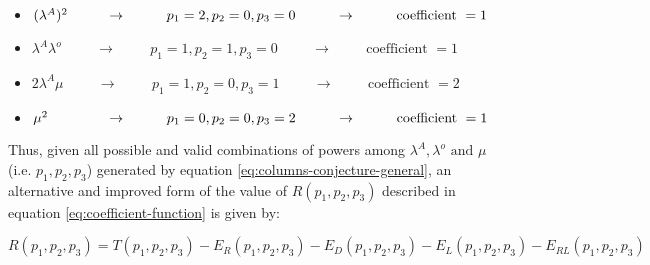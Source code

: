 \begin{itemize}
    \item \((\lambda^A)^2 \hspace{0.95cm} \rightarrow \hspace{1cm} 
    p_1 = 2, p_2=0, p_3=0 \hspace{1cm} \rightarrow \hspace{1cm} 
    \text{coefficient } = 1\)
    \item \(\lambda^A \lambda^o \hspace{1cm} \rightarrow \hspace{1cm} 
    p_1 = 1, p_2=1, p_3=0 \hspace{1cm} \rightarrow \hspace{1cm} 
    \text{coefficient } = 1\)
    \item \(2 \lambda^A \mu \hspace{1cm} \rightarrow \hspace{1cm}
     p_1 = 1, p_2=0, p_3=1 \hspace{1cm} \rightarrow \hspace{1cm} 
     \text{coefficient } = 2\)
    \item \(\mu^2 \hspace{1.45cm} \rightarrow \hspace{1cm} 
    p_1=0, p_2=0, p_3=2 \hspace{1cm} \rightarrow \hspace{1cm} 
    \text{coefficient } = 1\)
\end{itemize}

Thus, given all possible and valid combinations of powers among \(\lambda^A, 
\lambda^o \text{ and } \mu\) (i.e. \(p_1,p_2,p_3\)) generated by equation 
\ref{eq:columns-conjecture-general}, an alternative and improved form of the 
value of \(R(p_1, p_2, p_3)\) described in equation \ref{eq:coefficient-function} 
is given by:

\begin{equation} \label{eq:permutation formula}
    R(p_1, p_2, p_3) = T(p_1, p_2, p_3) - E_R(p_1, p_2, p_3) - E_D(p_1, p_2, p_3) 
    - E_L(p_1, p_2, p_3) - E_{RL}(p_1, p_2, p_3)
\end{equation}

